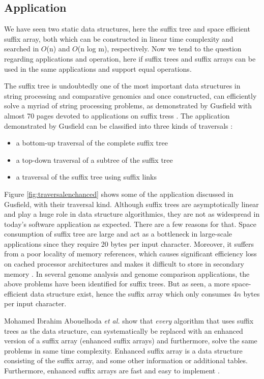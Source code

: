 \documentclass[12pt]{article} %
\begin{document}
\subsection{Application}

We have seen two static data structures, here the suffix tree and space efficient suffix array, both which can be constructed in linear time complexity and searched in $O$(n) and $O$(n log m), respectively. Now we tend to the question regarding applications and operation, here if suffix trees and suffix arrays can be used in the same applications and support equal operations. 

The suffix tree is undoubtedly one of the most important data structures in string processing and comparative genomics and once constructed, can efficiently solve a myriad of string processing problems, as demonstrated by Gusfield with almost 70 pages devoted to applications on suffix tress \cite{gusfield, enchancedsuffix}. The application demonstrated by Gusfield can be classified into three kinds of traversals \cite{enchancedsuffix}:
\begin{itemize}  
\item a bottom-up traversal of the complete suffix tree 
\item a top-down traversal of a subtree of the suffix tree 
\item a traversal of the suffix tree using suffix links 
\end{itemize}
Figure \ref{fig:traversalenchanced} shows some of the application discussed in Gusfield, with their traversal kind. Although suffix trees are asymptotically linear and play a huge role in data structure algorithmics, they are not as widespread in today's software application as expected. There are a few reasons for that. Space consumption of suffix tree are large and act as a bottleneck in large-scale applications since they require 20 bytes per input character. Moreover, it suffers from a poor locality of memory references, which causes significant efficiency loss on cached processor architectures and makes it difficult to store in secondary memory \cite{enchancedsuffix}. In several genome analysis and genome comparison applications, the above problems have been identified for suffix trees. But as seen, a more space-efficient data structure exist, hence the suffix array which only consumes 4$n$ bytes per input character\cite{enchancedsuffix}.   
 
Mohamed Ibrahim Abouelhoda \emph{et al.} \cite{enchancedsuffix} show that \emph{every} algorithm that uses suffix trees as the data structure, can systematically be replaced with an enhanced version of a suffix array (enhanced suffix arrays) and furthermore, solve the same problems in same time complexity. Enhanced suffix array is a data structure consisting of the suffix array, and some other information or additional tables. Furthermore, enhanced suffix arrays are fast and easy to implement \cite{enchancedsuffix}.
\end{document}
